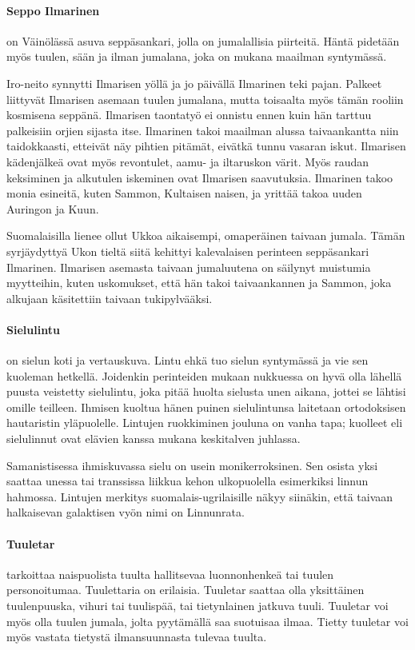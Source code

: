   \paragraph{Seppo Ilmarinen} on Väinölässä asuva seppäsankari, jolla on jumalallisia piirteitä.
    Häntä pidetään myös tuulen, sään ja ilman jumalana, joka on mukana maailman syntymässä.
    \par
    Iro-neito synnytti Ilmarisen yöllä ja jo päivällä Ilmarinen teki pajan. Palkeet liittyvät
    Ilmarisen asemaan tuulen jumalana, mutta toisaalta myös tämän rooliin kosmisena seppänä.
    Ilmarisen taontatyö ei onnistu ennen kuin hän tarttuu palkeisiin orjien sijasta itse.
    Ilmarinen takoi maailman alussa taivaankantta niin taidokkaasti, etteivät näy pihtien pitämät,
    eivätkä tunnu vasaran iskut. Ilmarisen kädenjälkeä ovat myös revontulet, aamu- ja iltaruskon
    värit. Myös raudan keksiminen ja alkutulen iskeminen ovat Ilmarisen saavutuksia. Ilmarinen
    takoo monia esineitä, kuten Sammon, Kultaisen naisen, ja yrittää takoa uuden Auringon ja Kuun.
    \par
    Suomalaisilla lienee ollut Ukkoa aikaisempi, omaperäinen taivaan jumala. Tämän syrjäydyttyä
    Ukon tieltä siitä kehittyi kalevalaisen perinteen seppäsankari Ilmarinen. Ilmarisen asemasta
    taivaan jumaluutena on säilynyt muistumia myytteihin, kuten uskomukset, että hän takoi
    taivaankannen ja Sammon, joka alkujaan käsitettiin taivaan tukipylvääksi.
  \paragraph{Sielulintu} on sielun koti ja vertauskuva. Lintu ehkä tuo sielun syntymässä ja vie sen
    kuoleman hetkellä. Joidenkin perinteiden mukaan nukkuessa on hyvä olla lähellä puusta
    veistetty sielulintu, joka pitää huolta sielusta unen aikana, jottei se lähtisi omille
    teilleen. Ihmisen kuoltua hänen puinen sielulintunsa laitetaan ortodoksisen hautaristin
    yläpuolelle. Lintujen ruokkiminen jouluna on vanha tapa; kuolleet eli sielulinnut ovat elävien
    kanssa mukana keskitalven juhlassa.
    \par
    Samanistisessa ihmiskuvassa sielu on usein monikerroksinen. Sen osista yksi saattaa unessa tai
    transsissa liikkua kehon ulkopuolella esimerkiksi linnun hahmossa. Lintujen merkitys
    suomalais-ugrilaisille näkyy siinäkin, että taivaan halkaisevan galaktisen vyön nimi on
    Linnunrata.
  \paragraph{Tuuletar} tarkoittaa naispuolista tuulta hallitsevaa luonnonhenkeä tai tuulen
    personoitumaa. Tuulettaria on erilaisia. Tuuletar saattaa olla yksittäinen tuulenpuuska,
    vihuri tai tuulispää, tai tietynlainen jatkuva tuuli. Tuuletar voi myös olla tuulen jumala,
    jolta pyytämällä saa suotuisaa ilmaa. Tietty tuuletar voi myös vastata tietystä ilmansuunnasta
    tulevaa tuulta.
